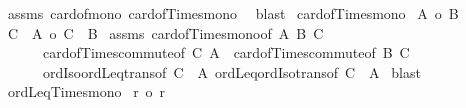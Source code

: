 \begin{isabellebody}
%
\isadelimproof
%
\endisadelimproof
%
\isatagproof
{}\isamarkupfalse%
\ assms\ card{\isacharunderscore}{\kern0pt}of{\isacharunderscore}{\kern0pt}mono{}\ card{\isacharunderscore}{\kern0pt}of{\isacharunderscore}{\kern0pt}Times{\isacharunderscore}{\kern0pt}mono{}\ \isamarkupfalse%
\ blast%
\endisatagproof
{\isafoldproof}%
%
\isadelimproof
\isanewline
%
\endisadelimproof
\isanewline
{}\isamarkupfalse%
\ card{\isacharunderscore}{\kern0pt}of{\isacharunderscore}{\kern0pt}Times{\isacharunderscore}{\kern0pt}mono{}{\isacharcolon}{\kern0pt}\isanewline
{}\ {\isachardoublequoteopen}{\isacharbar}{\kern0pt}A{\isacharbar}{\kern0pt}\ {\isasymle}o\ {\isacharbar}{\kern0pt}B{\isacharbar}{\kern0pt}{\isachardoublequoteclose}\isanewline
{}\ {\isachardoublequoteopen}{\isacharbar}{\kern0pt}C\ {\isasymtimes}\ A{\isacharbar}{\kern0pt}\ {\isasymle}o\ {\isacharbar}{\kern0pt}C\ {\isasymtimes}\ B{\isacharbar}{\kern0pt}{\isachardoublequoteclose}\isanewline
%
\isadelimproof
%
\endisadelimproof
%
\isatagproof
{}\isamarkupfalse%
\ assms\ card{\isacharunderscore}{\kern0pt}of{\isacharunderscore}{\kern0pt}Times{\isacharunderscore}{\kern0pt}mono{}{\isacharbrackleft}{\kern0pt}of\ A\ B\ C{\isacharbrackright}{\kern0pt}\isanewline
\ \ \ \ \ \ card{\isacharunderscore}{\kern0pt}of{\isacharunderscore}{\kern0pt}Times{\isacharunderscore}{\kern0pt}commute{\isacharbrackleft}{\kern0pt}of\ C\ A{\isacharbrackright}{\kern0pt}\ \ card{\isacharunderscore}{\kern0pt}of{\isacharunderscore}{\kern0pt}Times{\isacharunderscore}{\kern0pt}commute{\isacharbrackleft}{\kern0pt}of\ B\ C{\isacharbrackright}{\kern0pt}\isanewline
\ \ \ \ \ \ ordIso{\isacharunderscore}{\kern0pt}ordLeq{\isacharunderscore}{\kern0pt}trans{\isacharbrackleft}{\kern0pt}of\ {\isachardoublequoteopen}{\isacharbar}{\kern0pt}C\ {\isasymtimes}\ A{\isacharbar}{\kern0pt}{\isachardoublequoteclose}{\isacharbrackright}{\kern0pt}\ ordLeq{\isacharunderscore}{\kern0pt}ordIso{\isacharunderscore}{\kern0pt}trans{\isacharbrackleft}{\kern0pt}of\ {\isachardoublequoteopen}{\isacharbar}{\kern0pt}C\ {\isasymtimes}\ A{\isacharbar}{\kern0pt}{\isachardoublequoteclose}{\isacharbrackright}{\kern0pt}\isanewline
{}\isamarkupfalse%
\ blast%
\endisatagproof
{\isafoldproof}%
%
\isadelimproof
\isanewline
%
\endisadelimproof
\isanewline
{}\isamarkupfalse%
\ ordLeq{\isacharunderscore}{\kern0pt}Times{\isacharunderscore}{\kern0pt}mono{}{\isacharcolon}{\kern0pt}\isanewline
{}\ {\isachardoublequoteopen}r\ {\isasymle}o\ r{\isacharprime}{\kern0pt}{\isachardoublequoteclose}\isanewline

\end{isabellebody}
